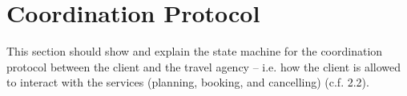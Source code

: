 \section{Coordination Protocol}

This section should show and explain the state machine for the coordination protocol between the client and the travel agency – i.e. how the client is allowed to interact with the services (planning, booking, and cancelling) (c.f. 2.2).